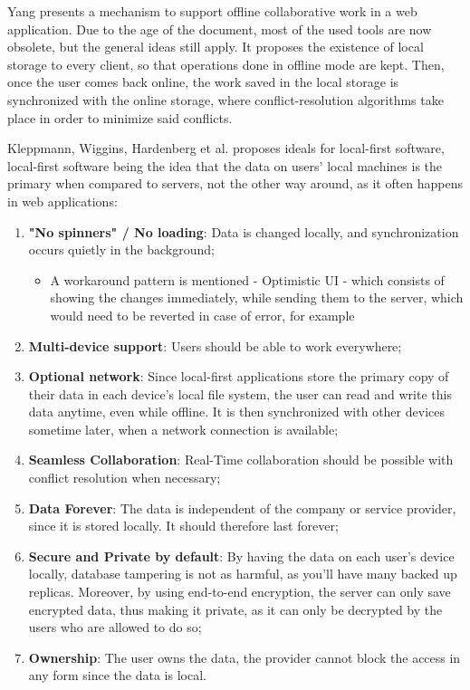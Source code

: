 Yang \cite{Yang2000} presents a mechanism to support offline collaborative work in a web application. Due to the age of the document, most of the used tools are now obsolete, but the general ideas still apply. It proposes the existence of local storage to every client, so that operations done in offline mode are kept. Then, once the user comes back online, the work saved in the local storage is synchronized with the online storage, where conflict-resolution algorithms take place in order to minimize said conflicts.

Kleppmann, Wiggins, Hardenberg et al. \cite{Kleppmann2019} proposes ideals for local-first software, local-first software being the idea that the data on users' local machines is the primary when compared to servers, not the other way around, as it often happens in web applications:

\begin{enumerate}
    \item \textbf{"No spinners" / No loading}: Data is changed locally, and synchronization occurs quietly in the background;
    \begin{itemize}
        \item A workaround pattern is mentioned - Optimistic UI - which consists of showing the changes immediately, while sending them to the server, which would need to be reverted in case of error, for example
    \end{itemize}
    \item \textbf{Multi-device support}: Users should be able to work everywhere;
    \item \textbf{Optional network}: Since local-first applications store the primary copy of their data in each device’s local file system, the user can read and write this data anytime, even while offline. It is then synchronized with other devices sometime later, when a network connection is available;
    \item \textbf{Seamless Collaboration}: Real-Time collaboration should be possible with conflict resolution when necessary;
    \item \textbf{Data Forever}: The data is independent of the company or service provider, since it is stored locally. It should therefore last forever;
    \item \textbf{Secure and Private by default}: By having the data on each user's device locally, database tampering is not as harmful, as you'll have many backed up replicas. Moreover, by using end-to-end encryption, the server can only save encrypted data, thus making it private, as it can only be decrypted by the users who are allowed to do so;
    \item \textbf{Ownership}: The user owns the data, the provider cannot block the access in any form since the data is local.
\end{enumerate}

